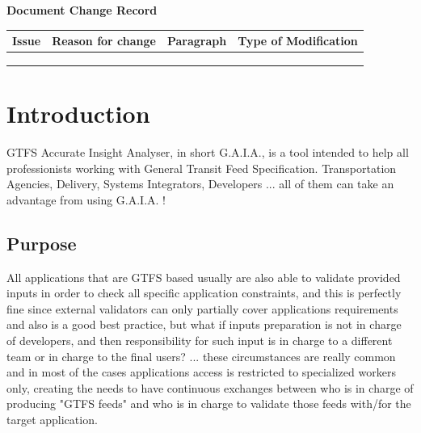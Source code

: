 \documentclass[12pt, a4paper]{book}
\newcommand*{\thead}[1]{\multicolumn{1}{|c|}{\bfseries #1}}
\begin{document}
\begin{center}
\textbf{{\large Document Change Record}}
\end{center}


\begin{table}[h]
\centering
	\begin{tabular}{|l|l|c|c|}
	\hline
	\thead{ Issue } & \thead{ Reason for change } & \thead{ Paragraph } & \thead{ Type of Modification } \\
	\hline	
	& & & \\
	\hline
	& & & \\
	\hline
	& & & \\
	\hline
	\end{tabular}	 	
\end{table}




\newpage
\section{Introduction}

\begin{justify}
GTFS Accurate Insight Analyser, in short G.A.I.A., is a tool intended to help all professionists working with General Transit Feed Specification. Transportation Agencies, Delivery, Systems Integrators, Developers ... all of them can take an advantage from using G.A.I.A. ! 
\end{justify}

\subsection{Purpose}

\begin{justify}
All applications that are GTFS based usually are also able to validate provided inputs in order to check all specific application constraints, and this is perfectly fine since external validators can only partially cover applications requirements and also is a good best practice, but what if inputs preparation is not in charge of developers, and then responsibility for such input is in charge to a different team or in charge to the final users? ... these circumstances are really common and in most of the cases applications access is restricted to specialized workers only, creating the needs to have continuous exchanges between who is in charge of producing "GTFS feeds" and who is in charge to validate those feeds with/for the target application.
\end{justify}
\end{document}
